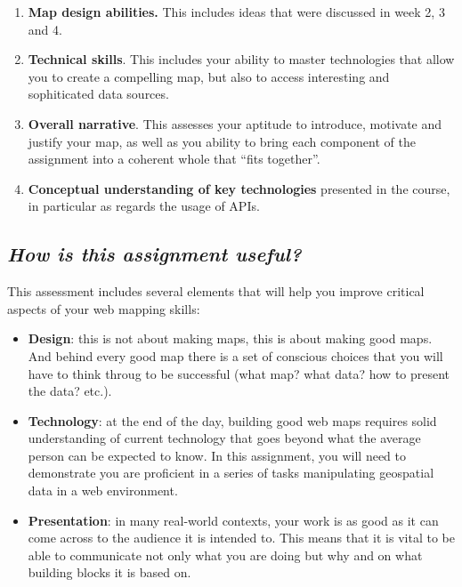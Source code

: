 \documentclass[
  letterpaper,
  DIV=11,
  numbers=noendperiod]{scrreprt}
\providecommand{\tightlist}{%
  \setlength{\itemsep}{0pt}\setlength{\parskip}{0pt}}\usepackage{longtable,booktabs,array}
\begin{document}
\begin{enumerate}
\def\labelenumi{\arabic{enumi}.}
\tightlist
\item
  \textbf{Map design abilities.} This includes ideas that were discussed
  in week 2, 3 and 4.
\item
  \textbf{Technical skills}. This includes your ability to master
  technologies that allow you to create a compelling map, but also to
  access interesting and sophiticated data sources.
\item
  \textbf{Overall narrative}. This assesses your aptitude to introduce,
  motivate and justify your map, as well as you ability to bring each
  component of the assignment into a coherent whole that ``fits
  together''.
\item
  \textbf{Conceptual understanding of key technologies} presented in the
  course, in particular as regards the usage of APIs.
\end{enumerate}

\subsection*{\texorpdfstring{\emph{How is this assignment
useful?}}{How is this assignment useful?}}\label{how-is-this-assignment-useful}

This assessment includes several elements that will help you improve
critical aspects of your web mapping skills:

\begin{itemize}
\tightlist
\item
  \textbf{Design}: this is not about making maps, this is about making
  good maps. And behind every good map there is a set of conscious
  choices that you will have to think throug to be successful (what map?
  what data? how to present the data? etc.).
\item
  \textbf{Technology}: at the end of the day, building good web maps
  requires solid understanding of current technology that goes beyond
  what the average person can be expected to know. In this assignment,
  you will need to demonstrate you are proficient in a series of tasks
  manipulating geospatial data in a web environment.
\item
  \textbf{Presentation}: in many real-world contexts, your work is as
  good as it can come across to the audience it is intended to. This
  means that it is vital to be able to communicate not only what you are
  doing but why and on what building blocks it is based on.
\end{itemize}
\end{document}
